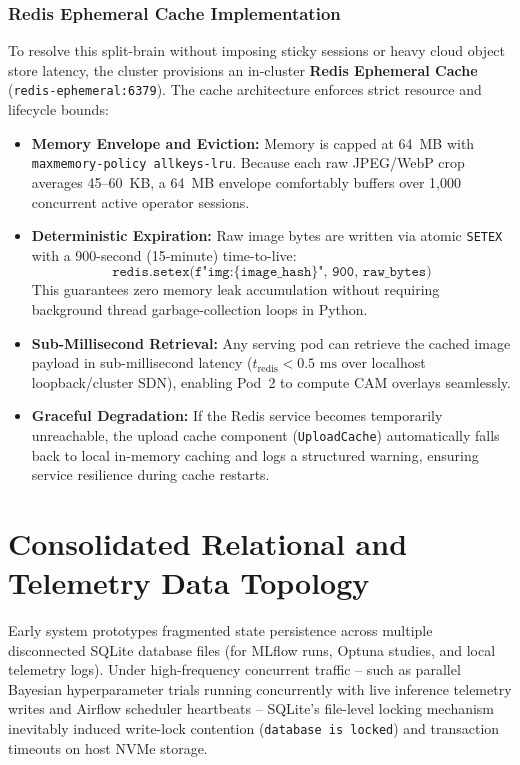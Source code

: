 \subsubsection{Redis Ephemeral Cache Implementation}
To resolve this split-brain without imposing sticky sessions or heavy cloud object store latency, the cluster provisions an in-cluster \textbf{Redis Ephemeral Cache} (\texttt{redis-ephemeral:6379}). The cache architecture enforces strict resource and lifecycle bounds:
\begin{itemize}
    \item \textbf{Memory Envelope and Eviction:} Memory is capped at 64~MB with \texttt{maxmemory-policy allkeys-lru}. Because each raw JPEG/WebP crop averages 45--60~KB, a 64~MB envelope comfortably buffers over 1,000 concurrent active operator sessions.
    \item \textbf{Deterministic Expiration:} Raw image bytes are written via atomic \texttt{SETEX} with a 900-second (15-minute) time-to-live:
    \[
    \texttt{redis.setex(f"img:\{image\_hash\}", 900, raw\_bytes)}
    \]
    This guarantees zero memory leak accumulation without requiring background thread garbage-collection loops in Python.
    \item \textbf{Sub-Millisecond Retrieval:} Any serving pod can retrieve the cached image payload in sub-millisecond latency ($t_{\text{redis}} < 0.5\text{ ms}$ over localhost loopback/cluster SDN), enabling Pod~2 to compute CAM overlays seamlessly.
    \item \textbf{Graceful Degradation:} If the Redis service becomes temporarily unreachable, the upload cache component (\texttt{UploadCache}) automatically falls back to local in-memory caching and logs a structured warning, ensuring service resilience during cache restarts.
\end{itemize}

\section{Consolidated Relational and Telemetry Data Topology}
\label{sec:postgres_topology}

Early system prototypes fragmented state persistence across multiple disconnected SQLite database files (for MLflow runs, Optuna studies, and local telemetry logs). Under high-frequency concurrent traffic -- such as parallel Bayesian hyperparameter trials running concurrently with live inference telemetry writes and Airflow scheduler heartbeats -- SQLite's file-level locking mechanism inevitably induced write-lock contention (\texttt{database is locked}) and transaction timeouts on host NVMe storage.

